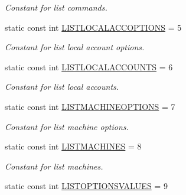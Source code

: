 \begin{DoxyCompactItemize}
\begin{DoxyCompactList}\small\item\em Constant for list commands. \item\end{DoxyCompactList}\item 
\hypertarget{classUMS__Data_1_1UMS__DataPackage_a8e1507b482eff991ec157df5dcd0b43e}{
static const int \hyperlink{classUMS__Data_1_1UMS__DataPackage_a8e1507b482eff991ec157df5dcd0b43e}{LISTLOCALACCOPTIONS} = 5}
\label{classUMS__Data_1_1UMS__DataPackage_a8e1507b482eff991ec157df5dcd0b43e}

\begin{DoxyCompactList}\small\item\em Constant for list local account options. \item\end{DoxyCompactList}\item 
\hypertarget{classUMS__Data_1_1UMS__DataPackage_a2e48aab798731e9930c6bb66756ba56c}{
static const int \hyperlink{classUMS__Data_1_1UMS__DataPackage_a2e48aab798731e9930c6bb66756ba56c}{LISTLOCALACCOUNTS} = 6}
\label{classUMS__Data_1_1UMS__DataPackage_a2e48aab798731e9930c6bb66756ba56c}

\begin{DoxyCompactList}\small\item\em Constant for list local accounts. \item\end{DoxyCompactList}\item 
\hypertarget{classUMS__Data_1_1UMS__DataPackage_afaed7b39232a0179de460f27c62fa7f3}{
static const int \hyperlink{classUMS__Data_1_1UMS__DataPackage_afaed7b39232a0179de460f27c62fa7f3}{LISTMACHINEOPTIONS} = 7}
\label{classUMS__Data_1_1UMS__DataPackage_afaed7b39232a0179de460f27c62fa7f3}

\begin{DoxyCompactList}\small\item\em Constant for list machine options. \item\end{DoxyCompactList}\item 
\hypertarget{classUMS__Data_1_1UMS__DataPackage_a5cd2e3af0f645efd2c06417bafc52a40}{
static const int \hyperlink{classUMS__Data_1_1UMS__DataPackage_a5cd2e3af0f645efd2c06417bafc52a40}{LISTMACHINES} = 8}
\label{classUMS__Data_1_1UMS__DataPackage_a5cd2e3af0f645efd2c06417bafc52a40}

\begin{DoxyCompactList}\small\item\em Constant for list machines. \item\end{DoxyCompactList}\item 
\hypertarget{classUMS__Data_1_1UMS__DataPackage_a461c14b6e4a03c2fd71d43be3508c3d5}{
static const int \hyperlink{classUMS__Data_1_1UMS__DataPackage_a461c14b6e4a03c2fd71d43be3508c3d5}{LISTOPTIONSVALUES} = 9}
\label{classUMS__Data_1_1UMS__DataPackage_a461c14b6e4a03c2fd71d43be3508c3d5}


\end{DoxyCompactItemize}
